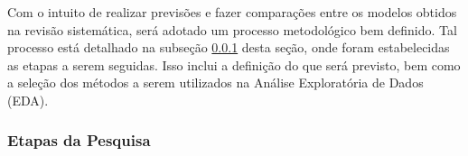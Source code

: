 Com o intuito de realizar previsões e fazer comparações entre os modelos obtidos na revisão sistemática, será adotado um processo metodológico bem definido. Tal processo está detalhado na subseção \ref{subsubsec:etp} desta seção, onde foram estabelecidas as etapas a serem seguidas. Isso inclui a definição do que será previsto, bem como a seleção dos métodos a serem utilizados na Análise Exploratória de Dados (EDA).
   

\subsubsection{Etapas da Pesquisa}\label{subsubsec:etp}

%
%	

